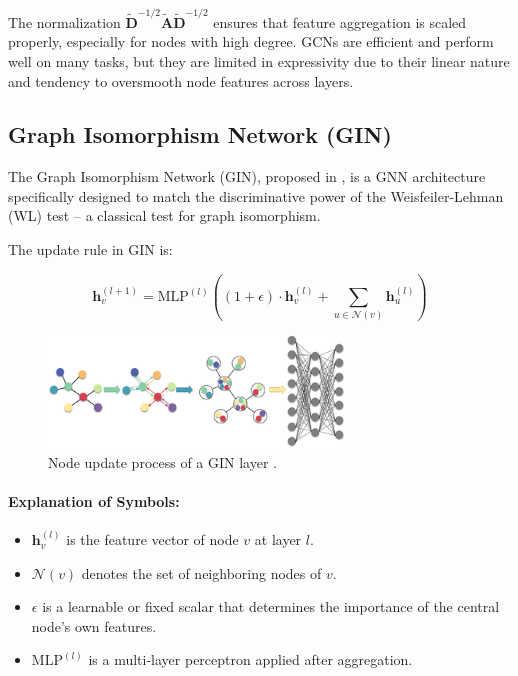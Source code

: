 \documentclass[11pt,a4paper]{article}
\begin{document}
	The normalization $\mathbf{\tilde{D}}^{-1/2} \mathbf{\tilde{A}} \mathbf{\tilde{D}}^{-1/2}$ ensures that feature aggregation is scaled properly, especially for nodes with high degree. GCNs are efficient and perform well on many tasks, but they are limited in expressivity due to their linear nature and tendency to oversmooth node features across layers.
	
	\subsection{Graph Isomorphism Network (GIN)}
	
	The Graph Isomorphism Network (GIN), proposed in \cite{xu2019powerful}, is a GNN architecture specifically designed to match the discriminative power of the Weisfeiler-Lehman (WL) test -- a classical test for graph isomorphism.
	
	The update rule in GIN is:
	
	\begin{equation}
		\mathbf{h}_v^{(l+1)} = \text{MLP}^{(l)} \left( (1 + \epsilon) \cdot \mathbf{h}_v^{(l)} + \sum_{u \in \mathcal{N}(v)} \mathbf{h}_u^{(l)} \right)
	\end{equation}
	
	\begin{figure}[h]
		\centering
		\includegraphics[width=0.7\textwidth]{gin.png}
		\caption{Node update process of a  GIN layer \cite{pic:gin}.}
	\end{figure}

	\paragraph{Explanation of Symbols:}
	\begin{itemize}
		\item $\mathbf{h}_v^{(l)}$ is the feature vector of node $v$ at layer $l$.
		\item $\mathcal{N}(v)$ denotes the set of neighboring nodes of $v$.
		\item $\epsilon$ is a learnable or fixed scalar that determines the importance of the central node's own features.
		\item $\text{MLP}^{(l)}$ is a multi-layer perceptron applied after aggregation.
	\end{itemize}
	
\end{document}
